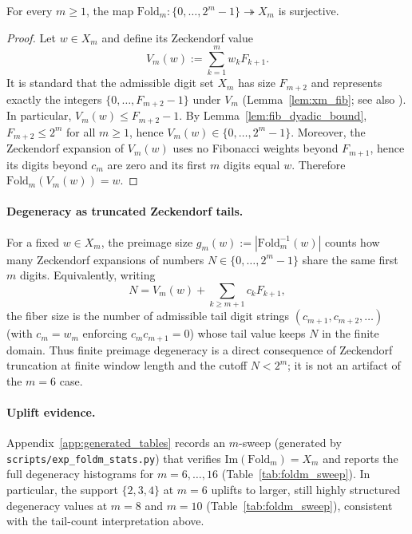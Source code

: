 \begin{proposition}\label{prop:foldm_surjective}
For every $m\ge 1$, the map $\mathrm{Fold}_m:\{0,\dots,2^m-1\}\twoheadrightarrow X_m$ is surjective.
\end{proposition}
\begin{proof}
Let $w\in X_m$ and define its Zeckendorf value
\[
V_m(w):=\sum_{k=1}^{m} w_k F_{k+1}.
\]
It is standard that the admissible digit set $X_m$ has size $F_{m+2}$ and represents exactly the integers $\{0,\dots,F_{m+2}-1\}$ under $V_m$ (Lemma~\ref{lem:xm_fib}; see also \cite{Zeckendorf1972,AlloucheShallit2003,DemontignyEtAl2013FDecompositions,BenAriMiller2014ProbabilisticZeckendorf,Dekking2020StructureZeckendorf}).
In particular, $V_m(w)\le F_{m+2}-1$.
By Lemma~\ref{lem:fib_dyadic_bound}, $F_{m+2}\le 2^m$ for all $m\ge 1$, hence $V_m(w)\in\{0,\dots,2^m-1\}$.
Moreover, the Zeckendorf expansion of $V_m(w)$ uses no Fibonacci weights beyond $F_{m+1}$, hence its digits beyond $c_m$ are zero and its first $m$ digits equal $w$.
Therefore $\mathrm{Fold}_m(V_m(w))=w$.
\end{proof}

\paragraph{Degeneracy as truncated Zeckendorf tails.}
For a fixed $w\in X_m$, the preimage size $g_m(w):=|\mathrm{Fold}_m^{-1}(w)|$ counts how many Zeckendorf expansions of numbers $N\in\{0,\dots,2^m-1\}$ share the same first $m$ digits.
Equivalently, writing
\[
N=V_m(w)+\sum_{k\ge m+1} c_k F_{k+1},
\]
the fiber size is the number of admissible tail digit strings $(c_{m+1},c_{m+2},\dots)$ (with $c_m=w_m$ enforcing $c_m c_{m+1}=0$) whose tail value keeps $N$ in the finite domain.
Thus finite preimage degeneracy is a direct consequence of Zeckendorf truncation at finite window length and the cutoff $N<2^m$; it is not an artifact of the $m=6$ case.

\paragraph{Uplift evidence.}
Appendix~\ref{app:generated_tables} records an $m$-sweep (generated by \texttt{scripts/exp\_foldm\_stats.py}) that verifies $\mathrm{Im}(\mathrm{Fold}_m)=X_m$ and reports the full degeneracy histograms for $m=6,\dots,16$ (Table~\ref{tab:foldm_sweep}).
In particular, the support $\{2,3,4\}$ at $m=6$ uplifts to larger, still highly structured degeneracy values at $m=8$ and $m=10$ (Table~\ref{tab:foldm_sweep}), consistent with the tail-count interpretation above.


